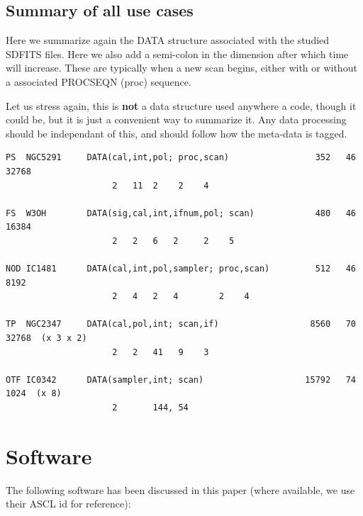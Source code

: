 \documentclass[12pt,a4paper]{article}
\begin{document}
\subsection{Summary of all use cases}

Here we summarize again the DATA structure associated with the studied
SDFITS files. Here we also add a semi-colon in the dimension after
which time will increase. These are typically when a new scan
begins, either with or without a associated PROCSEQN (proc) sequence.


Let us stress again, this is {\bf not} a data structure used anywhere
a code, though it could be, but it is just a convenient way to
summarize it. Any data processing should be independant of this, and
should follow how the meta-data is tagged.

\footnotesize
\begin{verbatim}
PS  NGC5291     DATA(cal,int,pol; proc,scan)                 352   46   32768
                     2   11  2    2    4

FS  W3OH        DATA(sig,cal,int,ifnum,pol; scan)            480   46   16384
                     2   2   6   2     2    5

NOD IC1481      DATA(cal,int,pol,sampler; proc,scan)         512   46    8192
                     2   4   2   4        2    4

TP  NGC2347     DATA(cal,pol,int; scan,if)                  8560   70   32768  (x 3 x 2)
                     2   2   41   9    3

OTF IC0342      DATA(sampler,int; scan)                    15792   74    1024  (x 8)
                     2       144, 54

\end{verbatim}
\normalsize

\section{Software}

The following software has been discussed in this paper (where available, we use their ASCL id for reference):
\end{document}
